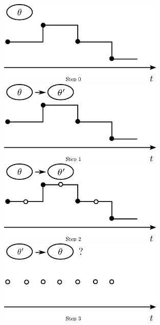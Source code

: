   \begin{figure}[H]
  \centering
  \begin{minipage}[!hp]{0.45\linewidth}
  \centering
    \includegraphics [width=0.70\textwidth, angle=0]{figs/plot0.pdf}
      \end{minipage}
  \begin{minipage}[hp]{0.45\linewidth}
  \centering
    \includegraphics [width=0.70\textwidth, angle=0]{figs/plot1.pdf}
    \vspace{-0 in}
  \end{minipage}
  \begin{minipage}[hp]{0.45\linewidth}
  \centering
    \includegraphics [width=0.70\textwidth, angle=0]{figs/plot2.pdf}
    \vspace{-0 in}
  \end{minipage}
  \begin{minipage}[hp]{0.45\linewidth}
  \centering
    \includegraphics [width=0.70\textwidth, angle=0]{figs/plot3.pdf}

\end{minipage}
\end{figure}

